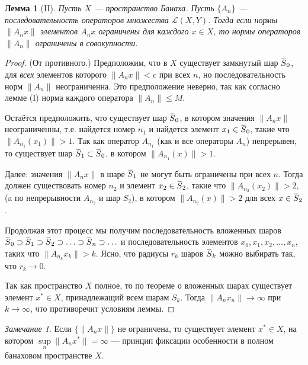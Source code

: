 \documentclass[12pt,a4paper,titlepage,oneside]{book}
\newcommand{\overbar}[1]{\mkern 1.5mu\overline{\mkern-1.5mu#1\mkern-1.5mu}\mkern 1.5mu}
\theoremstyle{definition}
\theoremstyle{plain}
\theoremstyle{break}
\theoremstyle{remark}
\newtheorem*{remark}{Замечание}
\theoremstyle{remark}
\theoremstyle{remark}
\theoremstyle{remark}
\theoremstyle{plain}
\newtheorem*{lemma}{Лемма}
\theoremstyle{plain}
\begin{document}
\begin{lemma}[II]
Пусть $X$ --- пространство Банаха. Пусть $\lbrace A_n\rbrace$ --- последовательность операторов множества $\mathcal{L}(X,Y)$. Тогда если нормы $\lVert A_n x\rVert$ элементов $A_n x$ ограничены для каждого $x \in X$, то нормы операторов $\lVert A_n\rVert$ ограничены в совокупности.
\end{lemma}

\begin{proof}
(От противного.)
Предположим, что в $X$ существует замкнутый шар $\overbar{S}_0$, для \textit{всех} элементов которого $\lVert A_n x\rVert < c$ при всех $n$, но последовательность норм $\lVert A_n\rVert$ неограниченна. Это предположение неверно, так как согласно лемме (I) норма каждого оператора $\lVert A_n\rVert \leqslant M$.

Остаётся предположить, что существует шар $\overbar{S}_0$, в котором значения $\lVert A_n x\rVert$ неограниченны, т.е. найдется номер $n_1$ и найдется элемент $x_1 \in \overbar{S}_0$, такие что $\lVert A_{n_1} (x_1)\rVert > 1$. Так как оператор $A_{n_1}$ (как и все операторы $A_n$) непрерывен, то существует шар $\overbar{S}_1 \subset \overbar{S}_0$, в котором $\lVert A_{n_1} (x)\rVert > 1$.

Далее: значения $\lVert A_n x\rVert$ в шаре $\overbar{S}_1$ не могут быть ограничены при всех $n$. Тогда должен существовать номер $n_2$ и элемент $x_2 \in \overbar{S}_2$, такие что $\lVert A_{n_2} (x_2)\rVert > 2$, (a по непрерывности $A_{n_2}$ и шар $S_2$), в котором $\lVert A_{n_2} (x)\rVert > 2$ для всех $x \in \overbar{S}_2$.

Продолжая этот процесс мы получим последовательность вложенных шаров $\overbar{S}_0 \supset \overbar{S}_1 \supset \overbar{S}_2 \supset \ldots \supset \overbar{S}_n \supset \ldots$ и последовательность элементов $x_0, x_1, x_2, \ldots, x_n$, таких что $\lVert A_{n_k} x_k\rVert > k$. Ясно, что радиусы $r_k$ шаров $\overbar{S}_k$ можно выбирать так, что $r_k \to 0$.

Так как пространство $X$ полное, то по теореме о вложенных шарах существует элемент $x^* \in X$, принадлежащий всем шарам $S_k$. Тогда $\lVert A_n x_n\rVert \to \infty$ при $k \to \infty$, что противоречит условиям леммы.
\end{proof}

\begin{remark}
Если $\lbrace \lVert A_n x\rVert \rbrace$ не ограничена, то существует элемент $x^* \in X$, на котором $\sup\limits_n \lVert A_n x^*\rVert = \infty$ --- принцип фиксации особенности в полном банаховом пространстве $X$.
\end{remark}
\end{document}
